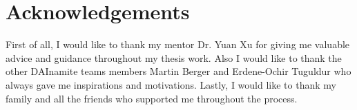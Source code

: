 \chapter*{Acknowledgements}

First of all, I would like to thank my mentor Dr. Yuan Xu for giving me valuable advice and guidance throughout my thesis work. Also I would like to thank the other DAInamite teams members Martin Berger and Erdene-Ochir Tuguldur who always gave me inspirations and motivations. Lastly, I would like to thank my family and all the friends who supported me throughout the process. 

